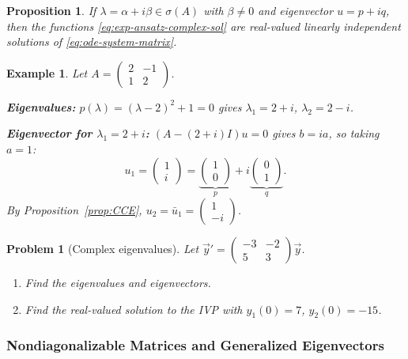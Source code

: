 \documentclass{article}
\newtheorem{problem}{Problem}
\newtheorem*{example}{Example}
\newtheorem{proposition}{Proposition}
\begin{document}
\begin{proposition}
    If $\lambda = \alpha + i\beta \in \sigma(A)$ with $\beta \neq 0$ 
    and eigenvector $u = p + iq$, then the functions 
    \eqref{eq:exp-ansatz-complex-sol} are real-valued linearly 
    independent solutions of \eqref{eq:ode-system-matrix}.
\end{proposition}

\begin{example}
    Let $A = \begin{pmatrix}2&-1\\1&2\end{pmatrix}$.

    \textbf{Eigenvalues:} $p(\lambda) = (\lambda-2)^2 + 1 = 0$ 
    gives $\lambda_1 = 2+i$, $\lambda_2 = 2-i$.

    \textbf{Eigenvector for $\lambda_1 = 2+i$:} 
    $(A-(2+i)I)u = 0$ gives $b = ia$, so taking $a=1$:
    \[u_1 = \begin{pmatrix}1\\i\end{pmatrix} = 
    \underbrace{\begin{pmatrix}1\\0\end{pmatrix}}_{p} + 
    i\underbrace{\begin{pmatrix}0\\1\end{pmatrix}}_{q}.\]
    By Proposition~\ref{prop:CCE}, $u_2 = \bar u_1 = 
    \begin{pmatrix}1\\-i\end{pmatrix}$.
\end{example}

\begin{problem}[Complex eigenvalues]
    Let $\vec{y}' = \begin{pmatrix}-3&-2\\5&3\end{pmatrix}\vec{y}$.
    \begin{enumerate}[label=(\alph*)]
        \item Find the eigenvalues and eigenvectors.
        \item Find the real-valued solution to the IVP with 
        $y_1(0) = 7$, $y_2(0) = -15$.
    \end{enumerate}
\end{problem}

\subsubsection{Nondiagonalizable Matrices and Generalized Eigenvectors}
\end{document}
